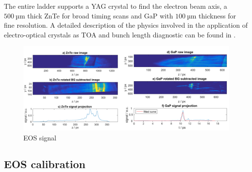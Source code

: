 The entire ladder supports a YAG crystal to find the electron beam axis, a $500\ \mathrm{µm}$ thick ZnTe for broad timing scans and GaP with $100\ \mathrm{µm}$ thickness for fine resolution.
A detailed description of the physics involved in the application of electro-optical crystals as TOA and bunch length diagnostic can be found in \cite{BerndSteffenPhD}.


\begin{figure}
\includegraphics[width=1.0\textwidth]{experiment/images/edited/EOS_Signal.pdf}
\caption{EOS signal}
\label{img:EOS_Signal}
\end{figure}
\subsection*{EOS calibration}

